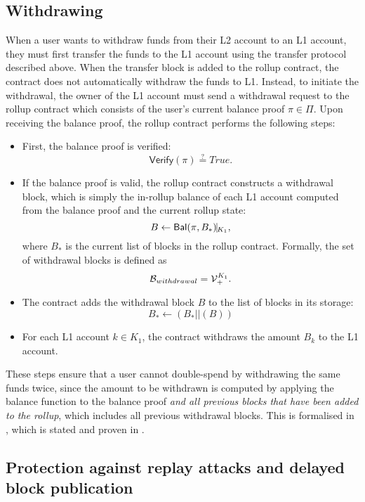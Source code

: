 \subsection{Withdrawing}\label{section:withdrawing}

When a user wants to withdraw funds from their L2 account to an L1 account, they must first transfer the funds to the L1 account using the transfer protocol described above. When the transfer block is added to the rollup contract, the contract does not automatically withdraw the funds to L1. Instead, to initiate the withdrawal, the owner of the L1 account must send a withdrawal request to the rollup contract which consists of the user's current balance proof \(\pi \in \Pi\). Upon receiving the balance proof, the rollup contract performs the following steps:

\begin{itemize}
    \item First, the balance proof is verified: \[\mathsf{Verify}(\pi) \stackrel{?}{=} True.\]
    \item If the balance proof is valid, the rollup contract constructs a withdrawal block, which is simply the in-rollup balance of each L1 account computed from the balance proof and the current rollup state:
    \[B \leftarrow \mathsf{Bal}(\pi,B_*)\vline_{K_1},\] where \(B_*\) is the current list of blocks in the rollup contract. Formally, the set of withdrawal blocks is defined \href{https://github.com/\repo FVIntmax/Block.lean#L31}{\ExternalLink}as \[\mathcal{B}_{withdrawal} = \mathcal{V}_+^{K_1}.\]
    \item The contract adds the withdrawal block \(B\) to the list of blocks in its storage: \[B_* \leftarrow (B_* || (B))\]
    \item For each L1 account \(k \in K_1\), the contract withdraws the amount \(B_k\) to the L1 account.
\end{itemize}

These steps ensure that a user cannot double-spend by withdrawing the same funds twice, since the amount to be withdrawn is computed by applying the balance function to the balance proof \emph{and all previous blocks that have been added to the rollup}, which includes all previous withdrawal blocks. This is formalised in , which is stated and proven in .

\subsection{Protection against replay attacks and delayed block publication}\label{section:protection}

